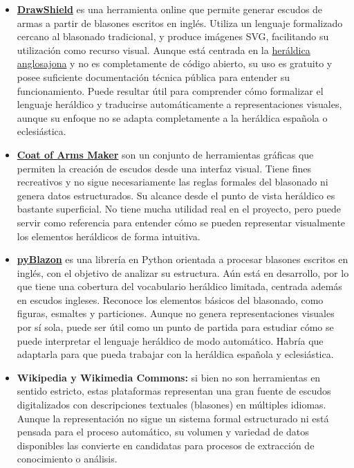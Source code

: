 \begin{itemize}
    \item \textbf{\href{https://drawshield.net/index.html}{DrawShield}} es una herramienta online que permite generar escudos de armas
    a partir de blasones escritos en inglés. Utiliza un lenguaje formalizado cercano al blasonado
    tradicional, y produce imágenes SVG, facilitando su utilización como recurso visual. Aunque está 
    centrada en la \hyperref[sec:heraldica]{heráldica anglosajona} y no es completamente de código abierto, su 
    uso es gratuito y posee suficiente documentación técnica pública para entender su 
    funcionamiento. Puede resultar útil para comprender cómo formalizar el lenguaje heráldico
    y traducirse automáticamente a representaciones visuales, aunque su enfoque no se adapta
    completamente a la heráldica española o eclesiástica.
    \item \textbf{\href{https://coamaker.com/}{Coat of Arms Maker}} son un conjunto de herramientas gráficas que permiten
    la creación de escudos desde una interfaz visual. Tiene fines recreativos y no sigue
    necesariamente las reglas formales del blasonado ni genera datos estructurados. Su alcance
    desde el punto de vista heráldico es bastante superficial. No tiene mucha utilidad real
    en el proyecto, pero puede servir como referencia para entender cómo se pueden representar
    visualmente los elementos heráldicos de forma intuitiva.
    \item \textbf{\href{https://web.meson.org/pyBlazon/}{pyBlazon}} es una librería en Python orientada a procesar blasones escritos en
    inglés, con el objetivo de analizar su estructura. Aún está en desarrollo, por lo que tiene
    una cobertura del vocabulario heráldico limitada, centrada además en escudos ingleses.
    Reconoce los elementos básicos del blasonado, como figuras, esmaltes y particiones.
    Aunque no genera representaciones visuales por sí sola, puede ser útil como un punto de partida
    para estudiar cómo se puede interpretar el lenguaje heráldico de modo automático. Habría que
    adaptarla para que pueda trabajar con la heráldica española y eclesiástica.
    \item \textbf{Wikipedia y Wikimedia Commons:} si bien no son herramientas en sentido estricto,
    estas plataformas representan una gran fuente de escudos digitalizados con descripciones
    textuales (blasones) en múltiples idiomas. Aunque la representación no sigue un sistema formal 
    estructurado ni está pensada para el proceso automático, su volumen y variedad de datos
    disponibles las convierte en candidatas para procesos de extracción de conocimiento o análisis.
\end{itemize}

